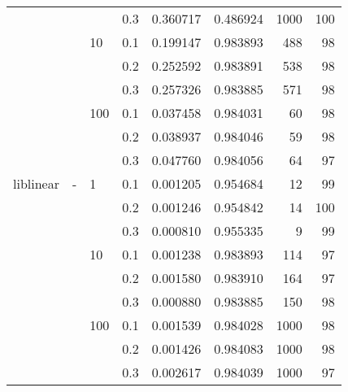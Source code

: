 \begin{table}[H]
\begin{tabular}{llllrrrr}
          &   &     & 0.3 &  0.360717 &  0.486924 &    1000 &   100 \\
          &   & 10  & 0.1 &  0.199147 &  0.983893 &     488 &    98 \\
          &   &     & 0.2 &  0.252592 &  0.983891 &     538 &    98 \\
          &   &     & 0.3 &  0.257326 &  0.983885 &     571 &    98 \\
          &   & 100 & 0.1 &  0.037458 &  0.984031 &      60 &    98 \\
          &   &     & 0.2 &  0.038937 &  0.984046 &      59 &    98 \\
          &   &     & 0.3 &  0.047760 &  0.984056 &      64 &    97 \\
liblinear & - & 1   & 0.1 &  0.001205 &  0.954684 &      12 &    99 \\
          &   &     & 0.2 &  0.001246 &  0.954842 &      14 &   100 \\
          &   &     & 0.3 &  0.000810 &  0.955335 &       9 &    99 \\
          &   & 10  & 0.1 &  0.001238 &  0.983893 &     114 &    97 \\
          &   &     & 0.2 &  0.001580 &  0.983910 &     164 &    97 \\
          &   &     & 0.3 &  0.000880 &  0.983885 &     150 &    98 \\
          &   & 100 & 0.1 &  0.001539 &  0.984028 &    1000 &    98 \\
          &   &     & 0.2 &  0.001426 &  0.984083 &    1000 &    98 \\
          &   &     & 0.3 &  0.002617 &  0.984039 &    1000 &    97 \\
\bottomrule
\end{tabular}
\end{table}
